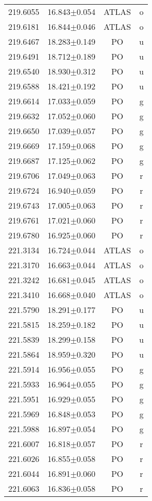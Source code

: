 \begin{table}
\begin{tabular}{cccc}
219.6055 & 16.843$\pm$0.054 & ATLAS & o \\
219.6181 & 16.844$\pm$0.046 & ATLAS & o \\
219.6467 & 18.283$\pm$0.149 & PO & u \\
219.6491 & 18.712$\pm$0.189 & PO & u \\
219.6540 & 18.930$\pm$0.312 & PO & u \\
219.6588 & 18.421$\pm$0.192 & PO & u \\
219.6614 & 17.033$\pm$0.059 & PO & g \\
219.6632 & 17.052$\pm$0.060 & PO & g \\
219.6650 & 17.039$\pm$0.057 & PO & g \\
219.6669 & 17.159$\pm$0.068 & PO & g \\
219.6687 & 17.125$\pm$0.062 & PO & g \\
219.6706 & 17.049$\pm$0.063 & PO & r \\
219.6724 & 16.940$\pm$0.059 & PO & r \\
219.6743 & 17.005$\pm$0.063 & PO & r \\
219.6761 & 17.021$\pm$0.060 & PO & r \\
219.6780 & 16.925$\pm$0.060 & PO & r \\
221.3134 & 16.724$\pm$0.044 & ATLAS & o \\
221.3170 & 16.663$\pm$0.044 & ATLAS & o \\
221.3242 & 16.681$\pm$0.045 & ATLAS & o \\
221.3410 & 16.668$\pm$0.040 & ATLAS & o \\
221.5790 & 18.291$\pm$0.177 & PO & u \\
221.5815 & 18.259$\pm$0.182 & PO & u \\
221.5839 & 18.299$\pm$0.158 & PO & u \\
221.5864 & 18.959$\pm$0.320 & PO & u \\
221.5914 & 16.956$\pm$0.055 & PO & g \\
221.5933 & 16.964$\pm$0.055 & PO & g \\
221.5951 & 16.929$\pm$0.055 & PO & g \\
221.5969 & 16.848$\pm$0.053 & PO & g \\
221.5988 & 16.897$\pm$0.054 & PO & g \\
221.6007 & 16.818$\pm$0.057 & PO & r \\
221.6026 & 16.855$\pm$0.058 & PO & r \\
221.6044 & 16.891$\pm$0.060 & PO & r \\
221.6063 & 16.836$\pm$0.058 & PO & r \\

\end{tabular}
\end{table}
